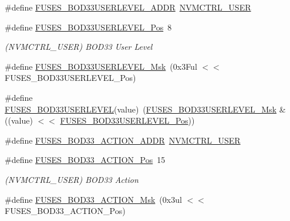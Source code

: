 \begin{DoxyCompactItemize}
\item 
\#define \mbox{\hyperlink{group__fuses__api_ga4fad8c709dc5dec570b92db72eace451}{F\+U\+S\+E\+S\+\_\+\+B\+O\+D33\+U\+S\+E\+R\+L\+E\+V\+E\+L\+\_\+\+A\+D\+DR}}~\mbox{\hyperlink{group___s_a_m_d21_j18_a__base_ga7a7a83a5753fa323b61536e396083c99}{N\+V\+M\+C\+T\+R\+L\+\_\+\+U\+S\+ER}}
\item 
\#define \mbox{\hyperlink{group__fuses__api_ga9e8109cd0996312419933645a2f2a089}{F\+U\+S\+E\+S\+\_\+\+B\+O\+D33\+U\+S\+E\+R\+L\+E\+V\+E\+L\+\_\+\+Pos}}~8
\begin{DoxyCompactList}\small\item\em (N\+V\+M\+C\+T\+R\+L\+\_\+\+U\+S\+ER) B\+O\+D33 User Level \end{DoxyCompactList}\item 
\#define \mbox{\hyperlink{group__fuses__api_ga830dd49d8c3e2d1f2ab5f77a901315c3}{F\+U\+S\+E\+S\+\_\+\+B\+O\+D33\+U\+S\+E\+R\+L\+E\+V\+E\+L\+\_\+\+Msk}}~(0x3\+Ful $<$$<$ F\+U\+S\+E\+S\+\_\+\+B\+O\+D33\+U\+S\+E\+R\+L\+E\+V\+E\+L\+\_\+\+Pos)
\item 
\#define \mbox{\hyperlink{group__fuses__api_ga8cc7a1bcf2ec2f7486235c9ae5c40c18}{F\+U\+S\+E\+S\+\_\+\+B\+O\+D33\+U\+S\+E\+R\+L\+E\+V\+EL}}(value)~(\mbox{\hyperlink{group__fuses__api_ga830dd49d8c3e2d1f2ab5f77a901315c3}{F\+U\+S\+E\+S\+\_\+\+B\+O\+D33\+U\+S\+E\+R\+L\+E\+V\+E\+L\+\_\+\+Msk}} \& ((value) $<$$<$ \mbox{\hyperlink{group__fuses__api_ga9e8109cd0996312419933645a2f2a089}{F\+U\+S\+E\+S\+\_\+\+B\+O\+D33\+U\+S\+E\+R\+L\+E\+V\+E\+L\+\_\+\+Pos}}))
\item 
\#define \mbox{\hyperlink{group__fuses__api_ga569f05e870ad0d72456c8e15c3b1c148}{F\+U\+S\+E\+S\+\_\+\+B\+O\+D33\+\_\+\+A\+C\+T\+I\+O\+N\+\_\+\+A\+D\+DR}}~\mbox{\hyperlink{group___s_a_m_d21_j18_a__base_ga7a7a83a5753fa323b61536e396083c99}{N\+V\+M\+C\+T\+R\+L\+\_\+\+U\+S\+ER}}
\item 
\#define \mbox{\hyperlink{group__fuses__api_gaac742323e1fa3072afa8ce20817c58f3}{F\+U\+S\+E\+S\+\_\+\+B\+O\+D33\+\_\+\+A\+C\+T\+I\+O\+N\+\_\+\+Pos}}~15
\begin{DoxyCompactList}\small\item\em (N\+V\+M\+C\+T\+R\+L\+\_\+\+U\+S\+ER) B\+O\+D33 Action \end{DoxyCompactList}\item 
\#define \mbox{\hyperlink{group__fuses__api_ga732fae9ecd483358a62bd56dc3e0a71b}{F\+U\+S\+E\+S\+\_\+\+B\+O\+D33\+\_\+\+A\+C\+T\+I\+O\+N\+\_\+\+Msk}}~(0x3ul $<$$<$ F\+U\+S\+E\+S\+\_\+\+B\+O\+D33\+\_\+\+A\+C\+T\+I\+O\+N\+\_\+\+Pos)
\item 
$$
\end{DoxyCompactItemize}
